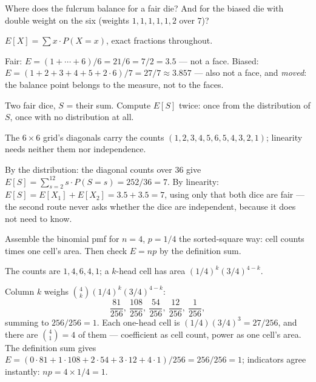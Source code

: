 \begin{problem}
Where does the fulcrum balance for a fair die? And for the biased
die with double weight on the six (weights $1,1,1,1,1,2$ over $7$)?
\begin{hint}
$E[X] = \sum x \cdot P(X = x)$, exact fractions throughout.
\end{hint}
\begin{solution}
Fair: $E = (1 + \cdots + 6)/6 = 21/6 = 7/2 = 3.5$ — not a face. Biased:
$E = (1 + 2 + 3 + 4 + 5 + 2 \cdot 6)/7 = 27/7 \approx 3.857$ — also
not a face, and \emph{moved}: the balance point belongs to the
measure, not to the faces.
\end{solution}
\end{problem}

\begin{problem}
Two fair dice, $S$ = their sum. Compute $E[S]$ twice: once from the
distribution of $S$, once with no distribution at all.
\begin{hint}
The $6 \times 6$ grid's diagonals carry the counts
$(1,2,3,4,5,6,5,4,3,2,1)$; linearity needs neither them nor
independence.
\end{hint}
\begin{solution}
By the distribution: the diagonal counts over $36$ give
$E[S] = \sum_{s=2}^{12} s \cdot P(S = s) = 252/36 = 7$. By linearity:
$E[S] = E[X_1] + E[X_2] = 3.5 + 3.5 = 7$, using only that both dice
are fair — the second route never asks whether the dice are
independent, because it does not need to know.
\end{solution}
\end{problem}

\begin{problem}
Assemble the binomial pmf for $n = 4$, $p = 1/4$ the sorted-square
way: cell counts times one cell's area. Then check $E = np$ by the
definition sum.
\begin{hint}
The counts are $1, 4, 6, 4, 1$; a $k$-head cell has area
$(1/4)^k (3/4)^{4-k}$.
\end{hint}
\begin{solution}
Column $k$ weighs $\binom{4}{k} (1/4)^k (3/4)^{4-k}$:
\[
  \frac{81}{256},\ \frac{108}{256},\ \frac{54}{256},\
  \frac{12}{256},\ \frac{1}{256},
\]
summing to $256/256 = 1$. Each one-head cell is
$(1/4)(3/4)^3 = 27/256$, and there are $\binom{4}{1} = 4$ of them —
coefficient as cell count, power as one cell's area. The definition
sum gives
$E = (0 \cdot 81 + 1 \cdot 108 + 2 \cdot 54 + 3 \cdot 12 + 4 \cdot 1)/256
= 256/256 = 1$; indicators agree instantly: $np = 4 \times 1/4 = 1$.
\end{solution}
\end{problem}

